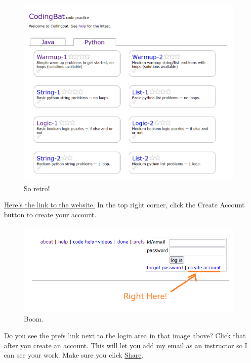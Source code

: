 \documentclass[12pt]{scrartcl}
\begin{document}
\begin{figure}[H]
    \centering
    \includegraphics[scale=0.55]{CodingBat MainPage.png}
    \caption*{So retro!}
\end{figure}

\newpage
\hyperlink{https://codingbat.com/python}{Here's the link to the website.} In the top right corner, click the Create Account button to create your account.

\begin{figure}[H]
    \centering
    \includegraphics[scale=0.6]{CreateAccount.png}
    \caption*{Boom.}
\end{figure}

Do you see the \hyperlink{https://codingbat.com/pref}{prefs} link next to the login area in that image above? Click that after you create an account. This will let you add my email as an instructor so I can see your work. Make sure you click \underline{Share}.
\end{document}

